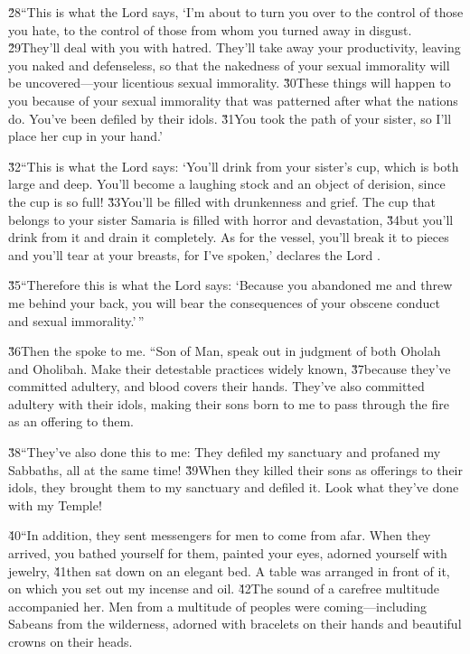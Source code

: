 \v{28}``This is what the Lord  says, `I'm about to turn you over to the control of those you hate, to the control of those from whom you turned away in disgust. \v{29}They'll deal with you with hatred. They'll take away your productivity, leaving you naked and defenseless, so that the nakedness of your sexual immorality will be uncovered---your licentious sexual immorality. \v{30}These things will happen to you because of your sexual immorality that was patterned after what the nations do. You've been defiled by their idols. \v{31}You took the path of your sister, so I'll place her cup in your hand.'

\v{32}``This is what the Lord  says: `You'll drink from your sister's cup, which is both large and deep. You'll become a laughing stock and an object of derision, since the cup is so full! \v{33}You'll be filled with drunkenness and grief. The cup that belongs to your sister Samaria is filled with horror and devastation, \v{34}but you'll drink from it and drain it completely. As for the vessel, you'll break it to pieces and you'll tear at your breasts, for I've spoken,' declares the Lord .

\v{35}``Therefore this is what the Lord  says: `Because you abandoned me and threw me behind your back, you will bear the consequences of your obscene conduct and sexual immorality.'\,''

\v{36}Then the  spoke to me. ``Son of Man, speak out in judgment of both Oholah and Oholibah. Make their detestable practices widely known, \v{37}because they've committed adultery, and blood covers their hands. They've also committed adultery with their idols, making their sons born to me to pass through the fire as an offering to them.

\v{38}``They've also done this to me: They defiled my sanctuary and profaned my Sabbaths, all at the same time! \v{39}When they killed their sons as offerings to their idols, they brought them to my sanctuary and defiled it. Look what they've done with my Temple!

\v{40}``In addition, they sent messengers for men to come from afar. When they arrived, you bathed yourself for them, painted your eyes, adorned yourself with jewelry, \v{41}then sat down on an elegant bed. A table was arranged in front of it, on which you set out my incense and oil. \v{42}The sound of a carefree multitude accompanied her. Men from a multitude of peoples were coming---including Sabeans from the wilderness, adorned with bracelets on their hands and beautiful crowns on their heads.

